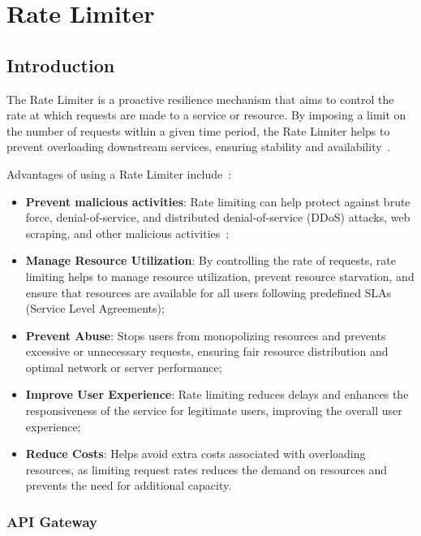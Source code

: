 \chapter{Rate Limiter}\label{ch:rate-limiter}



\section{Introduction}\label{sec:rate-limiter-introduction}

The Rate Limiter is a proactive resilience mechanism
that aims to control the rate at which requests are made to a service or resource.
By imposing a limit on the number of requests within a given time period,
the Rate Limiter helps to prevent overloading downstream services,
ensuring stability and availability~\cite{microsoft-rate-limiting-pattern}.

Advantages of using a Rate Limiter include~\cite{solo-io-rate-limiting, kong-rate-limiting}:

\begin{itemize}
    \item \textbf{Prevent malicious activities}: Rate limiting can help protect against brute force, denial-of-service, and distributed denial-of-service (DDoS) attacks, web scraping, and other malicious activities~\cite{cloudflare-rate-limiting};
    \item \textbf{Manage Resource Utilization}: By controlling the rate of requests, rate limiting helps to manage resource utilization, prevent resource starvation, and ensure that resources are available for all users following predefined SLAs (Service Level Agreements);
    \item \textbf{Prevent Abuse}: Stops users from monopolizing resources and prevents excessive or unnecessary requests, ensuring fair resource distribution and optimal network or server performance;
    \item \textbf{Improve User Experience}: Rate limiting reduces delays and enhances the responsiveness of the service for legitimate users, improving the overall user experience;
    \item \textbf{Reduce Costs}: Helps avoid extra costs associated with overloading resources, as limiting request rates reduces the demand on resources and prevents the need for additional capacity.
\end{itemize}

\subsection{API Gateway}\label{subsec:rate-limiter-api-gateway}

